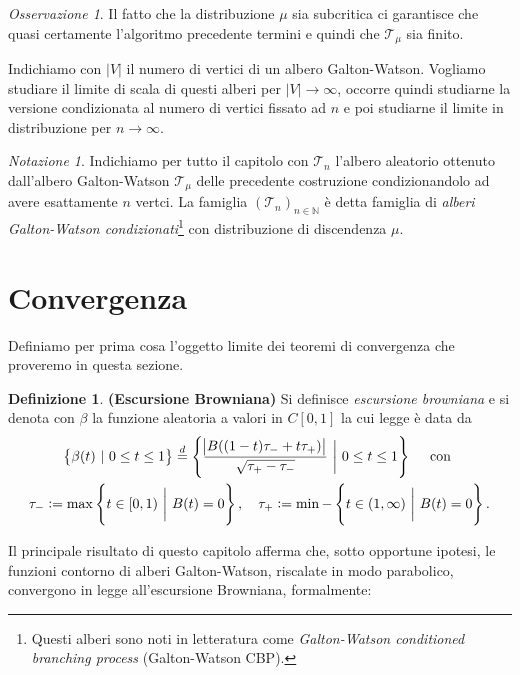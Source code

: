 \documentclass[11pt, twoside]{report}
\newcommand{\Tt}{\mathscr{T}}
\theoremstyle{definition}
\newtheorem{definizione}{Definizione}[chapter]
\theoremstyle{plain}
\theoremstyle{remark}
\newtheorem{oss}{Osservazione}[chapter]
\newtheorem{notazione}{Notazione}[chapter]
\numberwithin{equation}{chapter}
\begin{document}
\begin{oss}
Il fatto che la distribuzione $\mu$ sia subcritica ci garantisce che quasi certamente l'algoritmo precedente termini e quindi che $\Tt_{\mu}$ sia finito.
\end{oss}
\bigskip
Indichiamo con $|V|$ il numero di vertici di un albero Galton-Watson. Vogliamo studiare il limite di scala di questi alberi per $|V|\rightarrow\infty$, occorre quindi studiarne la versione condizionata al numero di vertici fissato ad $n$ e poi studiarne il limite in distribuzione per $n\rightarrow\infty$.

\begin{notazione}
Indichiamo per tutto il capitolo con $\Tt_n$ l'albero aleatorio ottenuto dall'albero Galton-Watson $\Tt_{\mu}$ delle precedente costruzione condizionandolo ad avere esattamente $n$ vertci. La famiglia $(\Tt_n)_{n\in\mathbb{N}}$ è detta famiglia di \textit{alberi Galton-Watson condizionati}\footnote{Questi alberi sono noti in letteratura come \textit{Galton-Watson conditioned branching process} (Galton-Watson CBP).} con distribuzione di discendenza $\mu$.
\end{notazione}


\section{Convergenza}
Definiamo per prima cosa l'oggetto limite dei teoremi di convergenza che proveremo in questa sezione.

\begin{definizione}{\textbf{(Escursione Browniana)}}
Si definisce \textit{escursione browniana} e si denota con $\beta$ la funzione aleatoria a valori in $C[0,1]$ la cui legge è data da
\begin{gather}
\left\{\beta(t) \ | \ 0\leq t\leq 1\right\} \stackrel{d}{=} \left\{\frac{\abs{B((1-t)\tau_- + t\tau_+)}}{\sqrt{\tau_+ -\tau_-}} \ \bigg| \ 0\leq t\leq 1 \right\} \quad \text{ con } \nonumber \\
\tau_-:=\max\left\{t\in[0,1) \ \bigg| \ B(t)=0\right\}, \quad \tau_+:=\min-\left\{t\in(1,\infty) \ \bigg| \ B(t)=0\right\}. \nonumber
\end{gather}
\end{definizione}

Il principale risultato di questo capitolo afferma che, sotto opportune ipotesi, le funzioni contorno di alberi Galton-Watson, riscalate in modo parabolico, convergono in legge all'escursione Browniana, formalmente:
\end{document}

